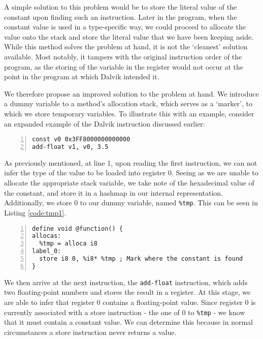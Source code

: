 A simple solution to this problem would be to store the literal value of the constant upon finding such an instruction. Later in the program, when the constant value is used in a type-specific way, we could proceed to allocate the value onto the stack and store the literal value that we have been keeping aside. While this method solves the problem at hand, it is not the `cleanest' solution available. Most notably, it tampers with the original instruction order of the program, as the storing of the variable in the register would not occur at the point in the program at which Dalvik intended it.

We therefore propose an improved solution to the problem at hand. We introduce a dummy variable to a method's allocation stack, which serves as a `marker', to which we store temporary variables. To illustrate this with an example, consider an expanded example of the Dalvik instruction discussed earlier:

\begin{lstlisting}[frame=single, numbers=left, numberstyle=\tiny]
const v0 0x3FF8000000000000
add-float v1, v0, 3.5
\end{lstlisting}

As previously mentioned, at line 1, upon reading the first instruction, we can not infer the type of the value to be loaded into register 0. Seeing as we are unable to allocate the appropriate stack variable, we take note of the hexadecimal value of the constant, and store it in a hashmap in our internal representation. Additionally, we store 0 to our dummy variable, named \verb|%tmp|. This can be seen in Listing \ref{code:tmp1}.

\begin{lstlisting}[frame=single, numbers=left, numberstyle=\tiny, caption={LLVM bytecode}, label=code:tmp1]
define void @function() {
allocas:
  %tmp = alloca i8
label_0:
  store i8 0, %i8* %tmp ; Mark where the constant is found
}
\end{lstlisting}

We then arrive at the next instruction, the \verb|add-float| instruction, which adds two floating-point numbers and stores the result in a register. At this stage, we are able to infer that register 0 contains a floating-point value. Since register 0 is currently associated with a store instruction - the one of 0 to \verb|%tmp| - we know that it must contain a constant value. We can determine this because in normal circumstances a store instruction never returns a value.

